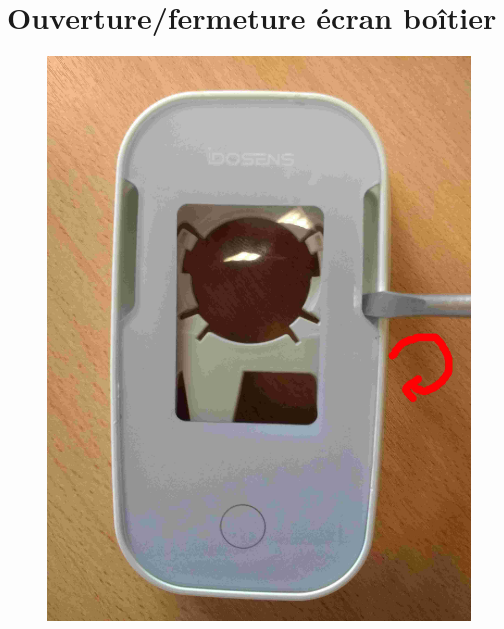 \documentclass{article}
\begin{document}
\section{Ouverture/fermeture écran boîtier}

\begin{figure}[H]
\begin{center}
\advance\leftskip-3cm
\advance\rightskip-3cm
\includegraphics[keepaspectratio=true,scale=0.1]{enlever_ecran_idosens.jpg}
\label{visina8}
\end{center}\end{figure}
\end{document}
